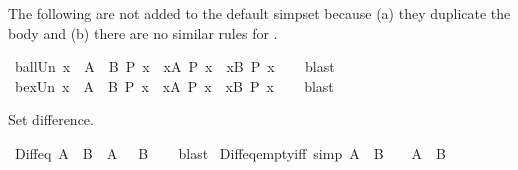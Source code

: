 \begin{isabellebody}
\begin{isamarkuptext}
  The following are not added to the default simpset because
  (a) they duplicate the body and (b) there are no similar rules for .%
\end{isamarkuptext}\isamarkuptrue%
\isamarkupfalse%
\ ball{\isacharunderscore}{\kern0pt}Un{\isacharcolon}{\kern0pt}\ {\isachardoublequoteopen}{\isacharparenleft}{\kern0pt}{\isasymforall}x\ {\isasymin}\ A\ {\isasymunion}\ B{\isachardot}{\kern0pt}\ P\ x{\isacharparenright}{\kern0pt}\ {\isasymlongleftrightarrow}\ {\isacharparenleft}{\kern0pt}{\isasymforall}x{\isasymin}A{\isachardot}{\kern0pt}\ P\ x{\isacharparenright}{\kern0pt}\ {\isasymand}\ {\isacharparenleft}{\kern0pt}{\isasymforall}x{\isasymin}B{\isachardot}{\kern0pt}\ P\ x{\isacharparenright}{\kern0pt}{\isachardoublequoteclose}\isanewline
%
\isadelimproof
\ \ %
\endisadelimproof
%
\isatagproof
{}\isamarkupfalse%
\ blast%
\endisatagproof
{\isafoldproof}%
%
\isadelimproof
\isanewline
%
\endisadelimproof
\isanewline
{}\isamarkupfalse%
\ bex{\isacharunderscore}{\kern0pt}Un{\isacharcolon}{\kern0pt}\ {\isachardoublequoteopen}{\isacharparenleft}{\kern0pt}{\isasymexists}x\ {\isasymin}\ A\ {\isasymunion}\ B{\isachardot}{\kern0pt}\ P\ x{\isacharparenright}{\kern0pt}\ {\isasymlongleftrightarrow}\ {\isacharparenleft}{\kern0pt}{\isasymexists}x{\isasymin}A{\isachardot}{\kern0pt}\ P\ x{\isacharparenright}{\kern0pt}\ {\isasymor}\ {\isacharparenleft}{\kern0pt}{\isasymexists}x{\isasymin}B{\isachardot}{\kern0pt}\ P\ x{\isacharparenright}{\kern0pt}{\isachardoublequoteclose}\isanewline
%
\isadelimproof
\ \ %
\endisadelimproof
%
\isatagproof
{}\isamarkupfalse%
\ blast%
\endisatagproof
{\isafoldproof}%
%
\isadelimproof
%
\endisadelimproof
%
\begin{isamarkuptext}%
\medskip Set difference.%
\end{isamarkuptext}\isamarkuptrue%
\isamarkupfalse%
\ Diff{\isacharunderscore}{\kern0pt}eq{\isacharcolon}{\kern0pt}\ {\isachardoublequoteopen}A\ {\isacharminus}{\kern0pt}\ B\ {\isacharequal}{\kern0pt}\ A\ {\isasyminter}\ {\isacharparenleft}{\kern0pt}{\isacharminus}{\kern0pt}\ B{\isacharparenright}{\kern0pt}{\isachardoublequoteclose}\isanewline
%
\isadelimproof
\ \ %
\endisadelimproof
%
\isatagproof
{}\isamarkupfalse%
\ blast%
\endisatagproof
{\isafoldproof}%
%
\isadelimproof
\isanewline
%
\endisadelimproof
\isanewline
{}\isamarkupfalse%
\ Diff{\isacharunderscore}{\kern0pt}eq{\isacharunderscore}{\kern0pt}empty{\isacharunderscore}{\kern0pt}iff\ {\isacharbrackleft}{\kern0pt}simp{\isacharbrackright}{\kern0pt}{\isacharcolon}{\kern0pt}\ {\isachardoublequoteopen}A\ {\isacharminus}{\kern0pt}\ B\ {\isacharequal}{\kern0pt}\ {\isacharbraceleft}{\kern0pt}{\isacharbraceright}{\kern0pt}\ {\isasymlongleftrightarrow}\ A\ {\isasymsubseteq}\ B{\isachardoublequoteclose}\isanewline

\end{isabellebody}
